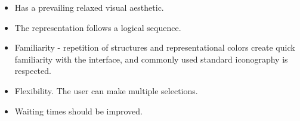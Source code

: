 \begin{itemize}
    \item Has a prevailing relaxed visual aesthetic.
    \item The representation follows a logical sequence.
    \item Familiarity - repetition of structures and representational colors create quick familiarity with the interface, and commonly used standard iconography is respected.
    \item Flexibility. The user can make multiple selections.
    \item Waiting times should be improved.
\end{itemize}